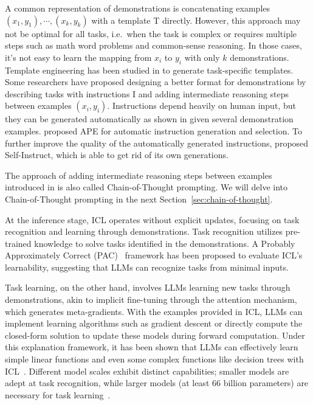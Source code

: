 A common representation of demonstrations is concatenating examples $(x_1, y_1), \cdots, (x_k, y_k)$ with a template T directly.
However, this approach may not be optimal for all tasks, i.e.\ when the task is complex or requires multiple steps such as math word problems and common-sense reasoning.
In those cases, it's not easy to learn the mapping from $x_i$ to $y_i$ with only $k$ demonstrations.
Template engineering has been studied in \textcite{liu2021pretrain, liu2022good} to generate task-specific templates.
Some researchers have proposed designing a better format for demonstrations by describing tasks with instructions I and adding intermediate reasoning steps between examples $(x_i, y_i)$.
Instructions depend heavily on human input, but they can be generated automatically as shown in \textcite{honovich2022instruction} given several demonstration examples.
\textcite{zhou2023large} proposed APE for automatic instruction generation and selection.
To further improve the quality of the automatically generated instructions, \textcite{wang2022selfinstruct} proposed Self-Instruct, which is able to get rid of its own generations.

The approach of adding intermediate reasoning steps between examples introduced in \textcite{wang2023large} is also called Chain-of-Thought prompting.
We will delve into Chain-of-Thought prompting in the next Section~\ref{sec:chain-of-thought}.

At the inference stage, ICL operates without explicit updates, focusing on task recognition and learning through demonstrations.
Task recognition utilizes pre-trained knowledge to solve tasks identified in the demonstrations.
A Probably Approximately Correct (PAC)~\cite{wies2023learnability} framework has been proposed to evaluate ICL’s learnability, suggesting that LLMs can recognize tasks from minimal inputs.

Task learning, on the other hand, involves LLMs learning new tasks through demonstrations, akin to implicit fine-tuning through the attention mechanism, which generates meta-gradients.
With the examples provided in ICL, LLMs can implement learning algorithms such as gradient descent or directly compute the closed-form solution to update these models during forward computation.
Under this explanation framework, it has been shown that LLMs can effectively learn simple linear functions and even some complex functions like decision trees with ICL~\cite{akyurek2022what}.
Different model scales exhibit distinct capabilities; smaller models are adept at task recognition, while larger models (at least 66 billion parameters) are necessary for task learning~\cite{pan2023what}.

